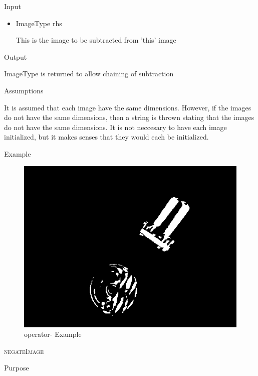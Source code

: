 \documentclass[pdftex, 11pt]{article}
\begin{document}
\begin{description}
\begin{description}
			\item{Input}

				\begin{itemize}

					\item{ImageType rhs}

						This is the image to be subtracted from
						'this' image

				\end{itemize}

			\item{Output}

				ImageType is returned to allow chaining of subtraction

			\item{Assumptions}

				It is assumed that each image have the same dimensions.
				However, if the images do not have the same dimensions,
				then a string is thrown stating that the images do
				not have the same dimensions. It is not neccesary to have
				each image initialized, but it makes senses
				that they would each be initialized.

			\item{Example}

				\begin{figure}[h]
					\centering
					\caption{operator- Example}
				\includegraphics{images/outsubtract.png}
			\end{figure}

		\end{description}


	\item{\textsc{negateImage}}
		\begin{description}
			\item{Purpose}


\end{description}
\end{description}
\end{document}
